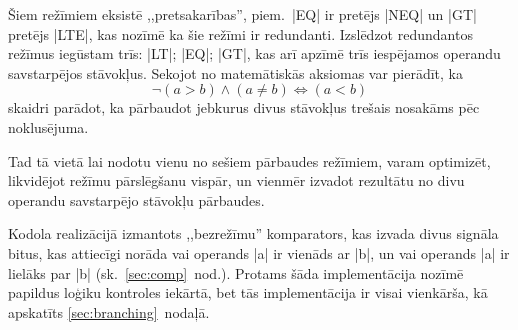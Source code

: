 	Šiem režīmiem eksistē ,,pretsakarības'', piem.~|EQ| ir pretējs |NEQ| un
	|GT| pretējs |LTE|, kas nozīmē ka šie režīmi ir redundanti. Izslēdzot
	redundantos režīmus iegūstam trīs: |LT|; |EQ|; |GT|, kas arī apzīmē
	trīs iespējamos operandu savstarpējos stāvokļus.
	Sekojot no matemātiskās aksiomas var pierādīt, ka
	\[
		\neg (a>b) \land (a \neq b) \iff (a<b)
	\]
	skaidri parādot, ka pārbaudot jebkurus divus stāvokļus trešais
	nosakāms pēc noklusējuma.
	\pagebreak[3]
	
	Tad tā vietā lai nodotu vienu no sešiem pārbaudes režīmiem,
	varam optimizēt, likvidējot režīmu pārslēgšanu vispār, un vienmēr izvadot
	rezultātu no divu operandu savstarpējo stāvokļu pārbaudes.
	
	Kodola realizācijā izmantots ,,bezrežīmu'' komparators, kas 
	izvada divus signāla bitus, kas attiecīgi norāda 
	vai operands |a| ir vienāds ar |b|, 
	un vai operands |a| ir lielāks par |b| (sk.~\ref{sec:comp}~nod.).
	Protams šāda implementācija nozīmē papildus loģiku kontroles iekārtā,
	bet tās implementācija ir visai vienkārša, kā apskatīts
	\ref{sec:branching}~nodaļā.

